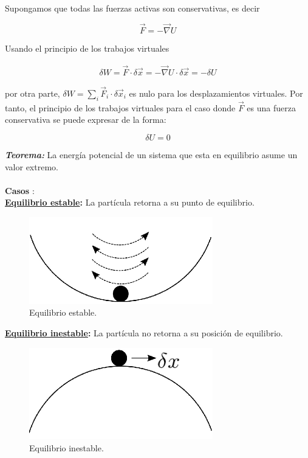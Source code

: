 \documentclass[12pt]{report}
\begin{document}
Supongamos que todas las fuerzas activas son conservativas, es decir

\begin{equation}
\vec{F}= -\vec{\nabla} U
\end{equation}

Usando el principio de los trabajos virtuales

\begin{eqnarray}
\delta W = \vec{F} \cdot \delta\vec{x}= -\vec{\nabla} U \cdot \delta\vec{x}=-\delta U
\end{eqnarray}

por otra parte, $\displaystyle \delta W = \sum_{i} \vec{F}_i \cdot \delta \vec{x}_i$ es nulo para los desplazamientos virtuales. Por tanto, el principio de los trabajos virtuales para el caso donde $\vec{F}$ es una fuerza conservativa se puede expresar de la forma:

\begin{equation}
\delta U = 0
\end{equation}

\textbf{\textit{Teorema:}} La energía potencial de un sistema que esta en equilibrio asume un valor extremo. \\ \\


\textbf{Casos} : \\ 

\textbf{\underline{Equilibrio estable}:} La partícula retorna a su punto de equilibrio. 

\begin{figure}[H]
	\begin{center}
	\includegraphics[width=8cm]{figura28.png} 
	\caption{ Equilibrio estable.}
	\label{fig.1}
	\end{center}
\end{figure}

\textbf{\underline{Equilibrio inestable}:} La partícula no retorna a su posición de equilibrio.

\begin{figure}[H]
	\begin{center}
	\includegraphics[width=8cm]{figura29.png} 
	\caption{Equilibrio inestable.}
	\label{fig.1}
	\end{center}
\end{figure}
\end{document}
